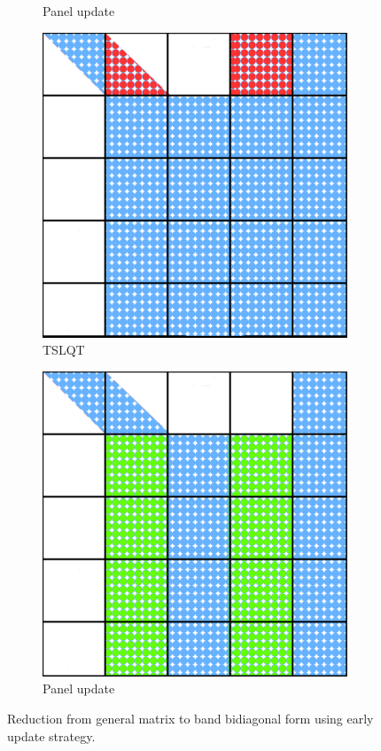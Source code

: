 \begin{figure}[h!]
\begin{subfigure}{0.2 \textwidth}
    \caption{\label{fig:tile_lq_update_2}Panel update}
  \end{subfigure}
  \hfill
  \begin{subfigure}{0.2 \textwidth}
    \includegraphics[width=\textwidth]{fig/SVD_tile_11_grid}
    \caption{\label{fig:tile_lq_update_2}TSLQT}
  \end{subfigure}
  \hfill
  \begin{subfigure}{0.2 \textwidth}
    \includegraphics[width=\textwidth]{fig/SVD_tile_12_grid}
    \caption{\label{fig:tile_lq_update_2}Panel update}
  \end{subfigure}
  \hfill

  \caption{Reduction from general matrix to band bidiagonal form
    using early update strategy.
    \label{fig:tile}}
\end{figure}

